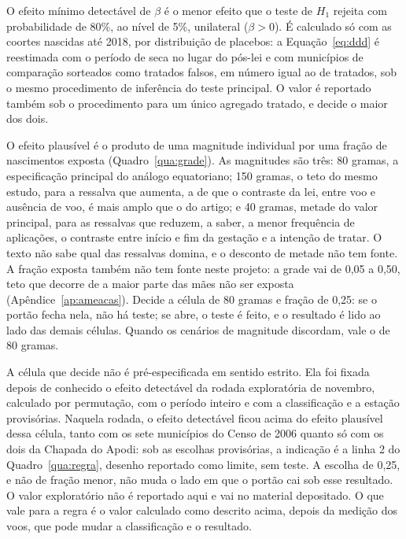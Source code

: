 \begin{apendicesenv}
O efeito mínimo detectável de $\beta$ é o menor efeito que o teste de $H_1$
rejeita com probabilidade de 80\%, ao nível de 5\%, unilateral ($\beta > 0$).
É calculado só com as coortes nascidas até 2018, por distribuição de placebos:
a Equação~\ref{eq:ddd} é reestimada com o período de seca no lugar do pós-lei
e com municípios de comparação sorteados como tratados falsos, em número igual
ao de tratados, sob o mesmo procedimento de inferência do teste principal. O
valor é reportado também sob o procedimento para um único agregado tratado, e
decide o maior dos dois.

O efeito plausível é o produto de uma magnitude individual por uma fração de
nascimentos exposta (Quadro~\ref{qua:grade}). As magnitudes são três: 80
gramas, a especificação principal do análogo equatoriano; 150 gramas, o teto
do mesmo estudo, para a ressalva que aumenta, a de que o contraste da lei,
entre voo e ausência de voo, é mais amplo que o do artigo; e 40 gramas, metade
do valor principal, para as ressalvas que reduzem, a saber, a menor frequência
de aplicações, o contraste entre início e fim da gestação e a intenção de
tratar. O texto não sabe qual das ressalvas domina, e o desconto de metade não
tem fonte. A fração exposta também não tem fonte neste projeto: a grade vai de
0,05 a 0,50, teto que decorre de a maior parte das mães não ser exposta
(Apêndice~\ref{ap:ameacas}). Decide a célula de 80 gramas e fração de 0,25:
se o portão fecha nela, não há teste; se abre, o teste é feito, e o resultado
é lido ao lado das demais células. Quando os cenários de magnitude discordam,
vale o de 80 gramas.

A célula que decide não é pré-especificada em sentido estrito. Ela foi fixada
depois de conhecido o efeito detectável da rodada exploratória de novembro,
calculado por permutação, com o período inteiro e com a classificação e a
estação provisórias. Naquela rodada, o efeito detectável ficou acima do
efeito plausível dessa célula, tanto com os sete municípios do Censo de 2006
quanto só com os dois da Chapada do Apodi: sob as escolhas provisórias, a
indicação é a linha 2 do Quadro~\ref{qua:regra}, desenho reportado como
limite, sem teste. A escolha de 0,25, e não de fração menor, não muda o lado
em que o portão cai sob esse resultado. O valor exploratório não é reportado
aqui e vai no material depositado. O que vale para a regra é o valor
calculado como descrito acima, depois da medição dos voos, que pode mudar a
classificação e o resultado.


\end{apendicesenv}
